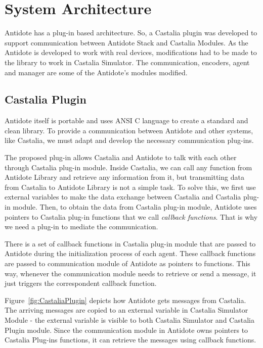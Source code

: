 \section{System Architecture}\label{systemarch}

Antidote has a plug-in based architecture. So, a Castalia plugin was developed to support communication between Antidote Stack and Castalia Modules. As the Antidote is developed to work with real devices, modifications had to be made to the library to work in Castalia Simulator. The communication, encoders, agent and manager are some of the Antidote's modules modified.

\subsection{Castalia Plugin}

Antidote itself is portable and uses ANSI C language to create a standard and clean library. To provide a communication between Antidote and other systems, like Castalia, we must adapt and develop the necessary communication plug-ins.

The proposed plug-in allows Castalia and Antidote to talk with each other through Castalia plug-in module. Inside Castalia, we can call any function from Antidote Library and retrieve any information from it, but transmitting data from Castalia to Antidote Library is not a simple task. To solve this, we first use external variables to make the data exchange between Castalia and Castalia plug-in module. Then, to obtain the data from Castalia plug-in module, Antidote uses pointers to Castalia plug-in functions that we call \textit{callback functions}. That is why we need a plug-in to mediate the communication. 

There is a set of callback functions in Castalia plug-in module that are passed to Antidote during the initialization process of each agent. These callback functions are passed to communication module of Antidote as pointers to functions. This way, whenever the communication module needs to retrieve or send a message, it just triggers the correspondent callback function. 

Figure~\ref{fig:CastaliaPlugin} depicts how Antidote gets messages from Castalia. The arriving messages are copied to an external variable in Castalia Simulator Module - the external variable is visible to both Castalia Simulator and Castalia Plugin module. Since the communication module in Antidote owns pointers to Castalia Plug-ins functions, it can retrieve the messages using callback functions.

